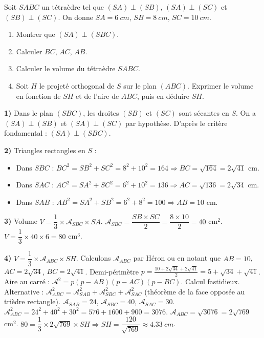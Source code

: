 \documentclass[11pt]{article}
\begin{document}
\begin{exercice}
Soit $SABC$ un tétraèdre tel que $(SA) \perp (SB)$, $(SA) \perp (SC)$ et $(SB) \perp (SC)$. On donne $SA = \SI{6}{cm}$, $SB = \SI{8}{cm}$, $SC = \SI{10}{cm}$.
\begin{enumerate}
\item Montrer que $(SA) \perp (SBC)$.
\item Calculer $BC$, $AC$, $AB$.
\item Calculer le volume du tétraèdre $SABC$.
\item Soit $H$ le projeté orthogonal de $S$ sur le plan $(ABC)$. Exprimer le volume en fonction de $SH$ et de l'aire de $ABC$, puis en déduire $SH$.
\end{enumerate}
\end{exercice}

\begin{corrige}[Exercice n°1]
\textbf{1)} Dans le plan $(SBC)$, les droites $(SB)$ et $(SC)$ sont sécantes en $S$. On a $(SA) \perp (SB)$ et $(SA) \perp (SC)$ par hypothèse. D'après le critère fondamental : $(SA) \perp (SBC)$.

\textbf{2)} Triangles rectangles en $S$ :
\begin{itemize}
\item Dans $SBC$ : $BC^2 = SB^2 + SC^2 = 8^2 + 10^2 = 164 \Rightarrow BC = \sqrt{164} = 2\sqrt{41}$ cm.
\item Dans $SAC$ : $AC^2 = SA^2 + SC^2 = 6^2 + 10^2 = 136 \Rightarrow AC = \sqrt{136} = 2\sqrt{34}$ cm.
\item Dans $SAB$ : $AB^2 = SA^2 + SB^2 = 6^2 + 8^2 = 100 \Rightarrow AB = 10$ cm.
\end{itemize}

\textbf{3)} Volume $V = \dfrac{1}{3} \times \mathcal{A}_{SBC} \times SA$. $\mathcal{A}_{SBC} = \dfrac{SB \times SC}{2} = \dfrac{8 \times 10}{2} = 40$ cm$^2$.
$V = \dfrac{1}{3} \times 40 \times 6 = 80$ cm$^3$.

\textbf{4)} $V = \dfrac{1}{3} \times \mathcal{A}_{ABC} \times SH$. Calculons $\mathcal{A}_{ABC}$ par Héron ou en notant que $AB=10$, $AC=2\sqrt{34}$, $BC=2\sqrt{41}$.
Demi-périmètre $p = \frac{10 + 2\sqrt{34} + 2\sqrt{41}}{2} = 5 + \sqrt{34} + \sqrt{41}$.
Aire au carré : $\mathcal{A}^2 = p(p-AB)(p-AC)(p-BC)$. Calcul fastidieux.
Alternative : $\mathcal{A}_{ABC}^2 = \mathcal{A}_{SAB}^2 + \mathcal{A}_{SBC}^2 + \mathcal{A}_{SAC}^2$ (théorème de la face opposée au trièdre rectangle).
$\mathcal{A}_{SAB} = 24$, $\mathcal{A}_{SBC} = 40$, $\mathcal{A}_{SAC} = 30$.
$\mathcal{A}_{ABC}^2 = 24^2 + 40^2 + 30^2 = 576 + 1600 + 900 = 3076$.
$\mathcal{A}_{ABC} = \sqrt{3076} = 2\sqrt{769}$ cm$^2$.
$80 = \dfrac{1}{3} \times 2\sqrt{769} \times SH \Rightarrow SH = \dfrac{120}{\sqrt{769}} \approx \SI{4,33}{cm}$.
\end{corrige}
\end{document}
